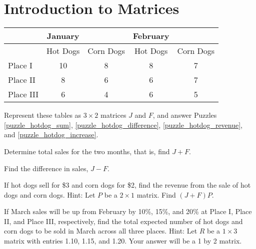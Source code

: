 \section{Introduction to Matrices}

\begin{center}
    \begin{tabular}{|l|cc|cc|}
        \hline
                  & January  &           & February &           \\
        \hline
                  & Hot Dogs & Corn Dogs & Hot Dogs & Corn Dogs \\
        \hline
        Place I   & 10       & 8         & 8        & 7         \\
        Place II  & 8        & 6         & 6        & 7         \\
        Place III & 6        & 4         & 6        & 5         \\
        \hline
    \end{tabular}
\end{center}

Represent these tables as \(3 \times 2\) matrices \(J\) and \(F\), and answer Puzzles \ref{puzzle_hotdog_sum}, \ref{puzzle_hotdog_difference}, \ref{puzzle_hotdog_revenue}, and \ref{puzzle_hotdog_increase}.


\begin{puzzle}\label{puzzle_hotdog_sum}
    Determine total sales for the two months, that is, find \(J + F\).
\end{puzzle}

\begin{puzzle}\label{puzzle_hotdog_difference}
    Find the difference in sales, \(J - F\).
\end{puzzle}

\begin{puzzle}\label{puzzle_hotdog_revenue}
    If hot dogs sell for \$3 and corn dogs for \$2, find the revenue from the sale of hot dogs and corn dogs. Hint: Let \(P\) be a \(2 \times 1\) matrix. Find \((J + F) P\).
\end{puzzle}

\begin{puzzle}\label{puzzle_hotdog_increase}
    If March sales will be up from February by 10\%, 15\%, and 20\% at Place I, Place II, and Place III, respectively, find the total expected number of hot dogs and corn dogs to be sold in March across all three places. Hint: Let \(R\) be a \(1 \times 3\) matrix with entries 1.10, 1.15, and 1.20. Your answer will be a 1 by 2 matrix.
\end{puzzle}

